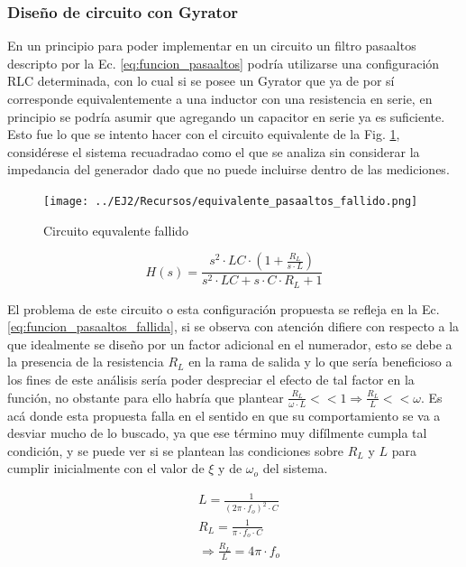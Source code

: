 \subsubsection{Dise\~no de circuito con Gyrator}

En un principio para poder implementar en un circuito un filtro pasaaltos descripto por la Ec. \ref{eq:funcion_pasaaltos} podr\'ia utilizarse una configuraci\'on RLC determinada,
con lo cual si se posee un Gyrator que ya de por s\'i corresponde equivalentemente a una inductor con una resistencia en serie, en principio se podr\'ia asumir que agregando un capacitor en serie ya es suficiente.
Esto fue lo que se intento hacer con el circuito equivalente de la Fig. \ref{fig:equivalente_pasaaltos_fallido}, consid\'erese el sistema recuadradao como el que se analiza sin considerar la impedancia del generador dado
que no puede incluirse dentro de las mediciones.

\begin{figure}[H]
    \centering
    \texttt{[image: ../EJ2/Recursos/equivalente\_pasaaltos\_fallido.png]}
    \caption{Circuito equvalente fallido}
    \label{fig:equivalente_pasaaltos_fallido}
\end{figure}

\begin{equation*}
    H(s) = \frac{s^{2} \cdot LC \cdot (1 + \frac{R_L}{s \cdot L})}{s^{2} \cdot LC + s \cdot C \cdot R_L + 1}
    \label{eq:funcion_pasaaltos_fallida}
\end{equation*}

El problema de este circuito o esta configuraci\'on propuesta se refleja en la Ec. \ref{eq:funcion_pasaaltos_fallida}, si se observa con atenci\'on difiere con respecto a la que idealmente se dise\~no por un factor
adicional en el numerador, esto se debe a la presencia de la resistencia $R_L$ en la rama de salida y lo que ser\'ia beneficioso a los fines de este an\'alisis ser\'ia poder despreciar el efecto de tal factor en la funci\'on, no obstante para ello
habr\'ia que plantear $\frac{R_L}{\omega \cdot L} << 1 \Rightarrow \frac{R_L}{L} << \omega$. Es ac\'a donde esta propuesta falla en el sentido en que su comportamiento se va a desviar mucho de lo buscado,
ya que ese t\'ermino muy dif\'ilmente cumpla tal condici\'on, y se puede ver si se plantean las condiciones sobre $R_L$ y $L$ para cumplir inicialmente con el valor de $\xi$ y de $\omega_o$ del sistema.

\begin{align*}
    & L = \frac{1}{(2 \pi \cdot f_o)^{2} \cdot C} \\
    & R_L = \frac{1}{\pi \cdot f_o \cdot C} \\
    & \Rightarrow \frac{R_L}{L} = 4 \pi \cdot f_o
\end{align*}

